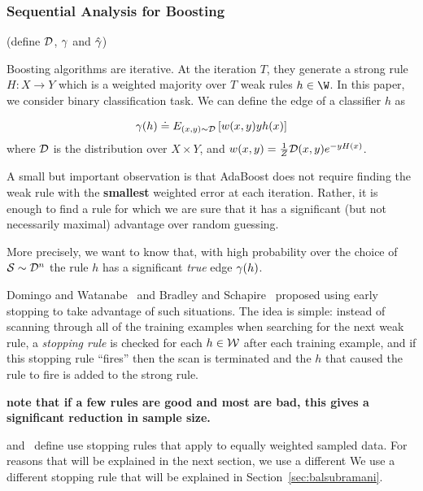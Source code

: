 \subsubsection{Sequential Analysis for Boosting}\label{sec:methods:early-stop}

(define ${\cal D}$, $\gamma$ and $\hat{\gamma}$)

Boosting algorithms are iterative.
At the iteration $T$, they generate a strong rule $H: X \rightarrow Y$
which is a weighted majority over $T$ weak rules $h \in \W$.
In this paper, we consider binary classification task.
We can define the edge of a classifier $h$ as

\begin{equation} \label{eqn:gamma_true}
\gamma(h) \doteq E_{(x,y) \sim {\cal D}} \left[ w(x,y) y h(x) \right]
\end{equation}
where ${\cal D}$ is the distribution over $X \times Y$,
and $w(x,y)=\frac{1}{Z} {\cal D}(x,y) e^{- y H(x)}$.


A small but important observation is that AdaBoost does not require
finding the weak rule with the {\bf smallest} weighted error at each
iteration. Rather, it is enough to find a rule for which we are sure
that it has a significant (but not necessarily maximal) advantage over
random guessing.


More precisely, we want to know that, with high
probability over the choice of ${\cal S} \sim {\cal D}^n$ the rule $h$
has a significant {\em true} edge $\gamma(h)$.

Domingo and Watanabe~\cite{domingo_scaling_2000} and Bradley and
Schapire~\cite{bradley_filterboost:_2007} proposed using early
stopping to take advantage of such situations. The idea is simple:
instead of scanning through all of the training examples when
searching for the next weak rule, a {\em stopping rule} is checked for
each $h \in \mathcal{W}$ after each training example, and if this stopping
rule ``fires'' then the scan is terminated and the $h$ that caused the
rule to fire is added to the strong rule.

{\bf note that if a few rules are good and most are bad, this gives a
  significant reduction in sample size.}

\cite{bradley_filterboost:_2007} and~\cite{domingo_scaling_2000}
define use stopping rules that apply to equally weighted sampled
data. For reasons that will be explained in the next section, we use a different
 We use a different stopping rule that will be explained in
 Section~\ref{sec:balsubramani}.


